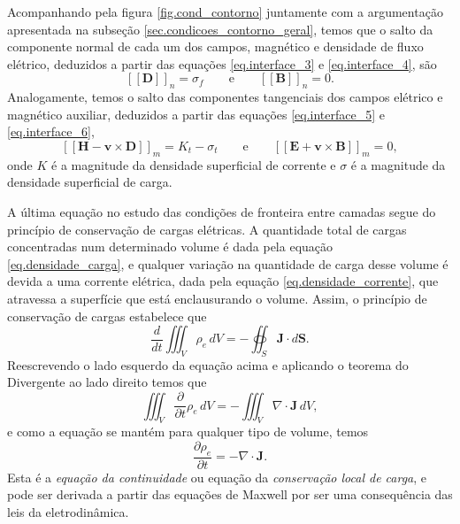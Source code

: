 Acompanhando pela figura \ref{fig.cond_contorno} juntamente com a argumenta\c{c}\~ao apresentada na subse\c{c}\~ao \ref{sec.condicoes_contorno_geral}, temos que o salto da componente normal de cada um dos campos, magn\'etico e densidade de fluxo el\'etrico, deduzidos a partir das equa\c{c}\~oes \ref{eq.interface_3} e \ref{eq.interface_4}, s\~ao
\begin{equation}
\left[\left[\mathbf{D}\right]\right]_n=\sigma_f\qquad\text{e}\qquad\left[\left[\mathbf{B}\right]\right]_n=0.
\end{equation}  
Analogamente, temos o salto das componentes tangenciais dos campos el\'etrico e magn\'etico auxiliar, deduzidos a partir das equa\c{c}\~oes \ref{eq.interface_5} e \ref{eq.interface_6},
\begin{equation}
\left[\left[\mathbf{H}-\mathbf{v}\times\mathbf{D}\right]\right]_m=K_t-\sigma_t\qquad\text{e}\qquad\left[\left[\mathbf{E}+\mathbf{v}\times\mathbf{B}\right]\right]_m=0,
\end{equation}
onde $K$ \'e a magnitude da densidade superficial de corrente e $\sigma$ \'e a magnitude da densidade superficial de carga.

A \'ultima equa\c{c}\~ao no estudo das condi\c{c}\~oes de fronteira entre camadas segue do princ\'ipio de conserva\c{c}\~ao de cargas el\'etricas. A quantidade total de cargas concentradas num determinado volume \'e dada pela equa\c{c}\~ao \ref{eq.densidade_carga}, e qualquer varia\c{c}\~ao na quantidade de carga desse volume \'e devida a uma corrente el\'etrica, dada pela equa\c{c}\~ao \ref{eq.densidade_corrente}, que atravessa a superf\'icie que est\'a enclausurando o volume. Assim,  o princ\'ipio de conserva\c{c}\~ao de cargas estabelece que
\begin{equation}\label{eq.conservacao_carga_1}
\frac{d}{dt}\iiint_V\rho_e\,dV=-\oiint_S\mathbf{J}\cdot d\mathbf{S}.
\end{equation}
Reescrevendo o lado esquerdo da equa\c{c}\~ao acima e aplicando o teorema do Divergente ao lado direito temos que
\begin{equation*}
\iiint_V\frac{\partial}{\partial t}\rho_e\,dV=-\iiint_V\nabla\cdot\mathbf{J}\,dV,
\end{equation*}
e como a equa\c{c}\~ao se mant\'em para qualquer tipo de volume, temos
\begin{equation*}
\frac{\partial\rho_e}{\partial t}=-\nabla\cdot\mathbf{J}.
\end{equation*}
Esta \'e a \textit{equa\c{c}\~ao da continuidade} ou equa\c{c}\~ao da \textit{conserva\c{c}\~ao local de carga}, e pode ser derivada a partir das equa\c{c}\~oes de Maxwell por ser uma consequ\^encia das leis da eletrodin\^amica. 

